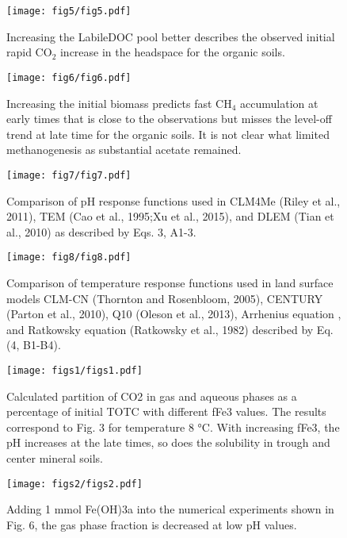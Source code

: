 \documentclass[12pt, a4paper]{article}
\begin{document}
\begin{figure}
\centering
\texttt{[image: fig5/fig5.pdf]}
\caption{
Increasing the LabileDOC pool better describes the observed initial rapid CO$_2$
increase in the headspace for the organic soils. 
}
\label{fig5}
\end{figure}

\begin{figure}
\centering
\texttt{[image: fig6/fig6.pdf]}
\caption{
Increasing the initial biomass predicts fast CH$_4$ accumulation at early times
that is close to the observations but misses the level-off trend at late time
for the organic soils. It is not clear what limited methanogenesis as
substantial acetate remained. 
}
\label{fig6}
\end{figure}

\begin{figure}
\centering
\texttt{[image: fig7/fig7.pdf]}
\caption{
Comparison of pH response functions used in CLM4Me (Riley et al., 2011), TEM
(Cao et al., 1995;Xu et al., 2015), and DLEM (Tian et al., 2010) as described
by Eqs. 3, A1-3.
}
\label{fig7}
\end{figure}

\begin{figure}
\centering
\texttt{[image: fig8/fig8.pdf]}
\caption{
Comparison of temperature response functions used in land surface models CLM-CN
(Thornton and Rosenbloom, 2005), CENTURY (Parton et al., 2010), Q10 (Oleson et
al., 2013), Arrhenius equation , and Ratkowsky equation  (Ratkowsky et al.,
1982) described by Eq. (4, B1-B4). 
}
\label{fig8}
\end{figure}

\begin{figure}
\centering
\texttt{[image: figs1/figs1.pdf]}
\caption{
Calculated partition of CO2 in gas and aqueous phases as a percentage of
initial TOTC with different fFe3 values. The results correspond to Fig. 3 for
temperature 8 °C.  With increasing fFe3, the pH increases at the late times, so
does the solubility in trough and center mineral soils.  
}
\label{figs1}
\end{figure}

\begin{figure}
\centering
\texttt{[image: figs2/figs2.pdf]}
\caption{
Adding 1 mmol Fe(OH)3a into the numerical experiments shown in Fig. 6, the gas
phase fraction is decreased at low pH values.
}
\label{figs2}
\end{figure}
\end{document}
